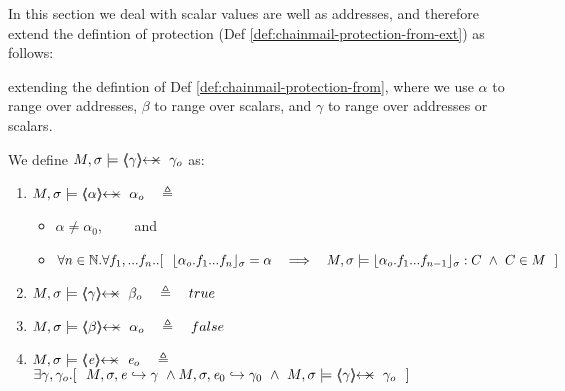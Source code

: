 In this section we deal with scalar values are well as addresses, and therefore extend the defintion of protection (Def \ref{def:chainmail-protection-from-ext}) as follows:

\begin{definition}
\label{def:chainmail-protection-from-ext}
extending the defintion of Def 
\ref{def:chainmail-protection-from}, where we use $\alpha$ to range over addresses, $\beta$  to range over scalars, and   $\gamma$ to range over addresses or scalars.

\noindent
We define  $\satisfiesA{M}{\sigma}{\protectedFrom{{\gamma}} {{\gamma_{o}}}} $ as:
\begin{enumerate}
\item
\label{cProtected}
 $\satisfiesA{M}{\sigma}{\protectedFrom{{\alpha}} {{\alpha_{o}}}}   \ \ \ \triangleq $ 
  \begin{itemize}
 \item
$\alpha\neq \alpha_0$,
 \ \ \ \  and%
 \item
$\forall n\in\mathbb{N}. \forall f_1,...f_n..
[\ \ \interpret{\sigma}{\alpha_{o}.f_1...f_n}=\alpha \ \ \  \Longrightarrow \ \ \  \satisfiesA{M}{\sigma}{ {\interpret{\sigma}{\alpha_{o}.f_1...f_{n-1}}}:C} \ \wedge \ C\in M\ \ ]$
\end{itemize}
\item
 $\satisfiesA{M}{\sigma}{\protectedFrom{{\gamma}} {{\beta_{o}}}}   \ \ \ \triangleq  \ \ \ true$
 \item
 $\satisfiesA{M}{\sigma}{\protectedFrom{{\beta}} {{\alpha_{o}}}}   \ \ \ \triangleq  \ \ \ false$
  \item
$\satisfiesA{M}{\sigma}{\protectedFrom{{\re}} {{\re_{o}}}} \ \ \ \triangleq $ \\
  $\exists \gamma, \gamma_{o}. [\  \ \eval{M}{\sigma}{{\re}}{\gamma}\ \wedge \eval{M}{\sigma}{{\re_0}}{\gamma_0} \  \wedge \ 
  \satisfiesA{M}{\sigma}{\protectedFrom{{\gamma}} {{\gamma_{o}}}}
 \ \  ]$
 \end{enumerate}
 \end{definition} 


